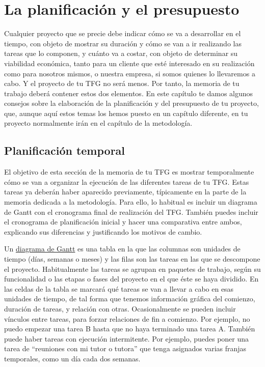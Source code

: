 \chapter{La planificación y el presupuesto}
\label{cap:PlanificacionPresupuesto}

Cualquier proyecto que se precie debe indicar cómo se va a desarrollar en el tiempo, con objeto de mostrar su duración y cómo se van a ir realizando las tareas que lo componen, y cuánto va a costar, con objeto de determinar su viabilidad económica, tanto para un cliente que esté interesado en su realización como para nosotros mismos, o nuestra empresa, si somos quienes lo llevaremos a cabo. Y el proyecto de tu TFG no será menos. Por tanto, la memoria de tu trabajo deberá contener estos dos elementos. En este capítulo te damos algunos consejos sobre la elaboración de la planificación y del presupuesto de tu proyecto, que, aunque aquí estos temas los hemos puesto en un capítulo diferente, en tu proyecto normalmente irán en el capítulo de la metodología.

\section{Planificación temporal}
El objetivo de esta sección de la memoria de tu TFG es mostrar temporalmente cómo se van a organizar la ejecución de las diferentes tareas de tu TFG. Estas tareas ya deberán haber aparecido previamente, típicamente en la parte de la memoria dedicada a la metodología. Para ello, lo habitual es incluir un diagrama de Gantt con el cronograma final de realización del TFG. También puedes incluir el cronograma de planificación inicial y hacer una comparativa entre ambos, explicando sus diferencias y justificando los motivos de cambio.

Un \href{https://blog.ganttpro.com/en/ultimate-guide-gantt-charts/}{diagrama de Gantt} es una tabla en la que las columnas son unidades de tiempo (días, semanas o meses) y las filas son las tareas en las que se descompone el proyecto. Habitualmente las tareas se agrupan en paquetes de trabajo, según su funcionalidad o las etapas o fases del proyecto en el que éste se haya dividido. En las celdas de la tabla se marcará qué tareas se van a llevar a cabo en esas unidades de tiempo, de tal forma que tenemos información gráfica del comienzo, duración de tareas, y relación con otras. Ocasionalmente se pueden incluir vínculos entre tareas, para forzar relaciones de fin a comienzo. Por ejemplo, no puedo empezar una tarea B hasta que no haya terminado una tarea A. También puede haber tareas con ejecución intermitente. Por ejemplo, puedes poner una tarea de ``reuniones con mi tutor o tutora'' que tenga asignados varias franjas temporales, como un día cada dos semanas.

